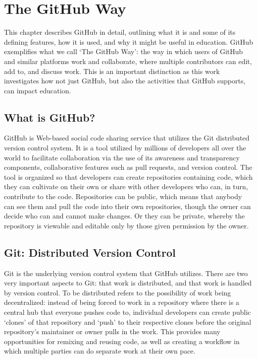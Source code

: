 \chapter{The GitHub Way}
This chapter describes GitHub in detail, outlining what it is and some of its defining features, how it is used, and why it might be useful in education. GitHub exemplifies what we call `The GitHub Way': the way in which users of GitHub and similar platforms work and collaborate, where multiple contributors can edit, add to, and discuss work. This is an important distinction as this work investigates how not just GitHub, but also the activities that GitHub supports, can impact education. %

\section{What is GitHub?}
GitHub is Web-based social code sharing service that utilizes the Git distributed version control system. It is a tool utilized by millions of developers all over the world to facilitate collaboration via the use of its awareness and transparency components, collaborative features such as pull requests, and version control. The tool is organized so that developers can create repositories containing code, which they can cultivate on their own or share with other developers who can, in turn, contribute to the code. Repositories can be public, which means that anybody can see them and pull the code into their own repositories, though the owner can decide who can and cannot make changes. Or they can be private, whereby the repository is viewable and editable only by those given permission by the owner.

\section{Git: Distributed Version Control}
Git is the underlying version control system that GitHub utilizes. There are two very important aspects to Git: that work is distributed, and that work is handled by version control. To be distributed refers to the possibility of work being decentralized: instead of being forced to work in a repository where there is a central hub that everyone pushes code to, individual developers can create public `clones' of that repository and `push' to their respective clones before the original repository's maintainer or owner pulls in the work. This provides many opportunities for remixing and reusing code, as well as creating a workflow in which multiple parties can do separate work at their own pace.

